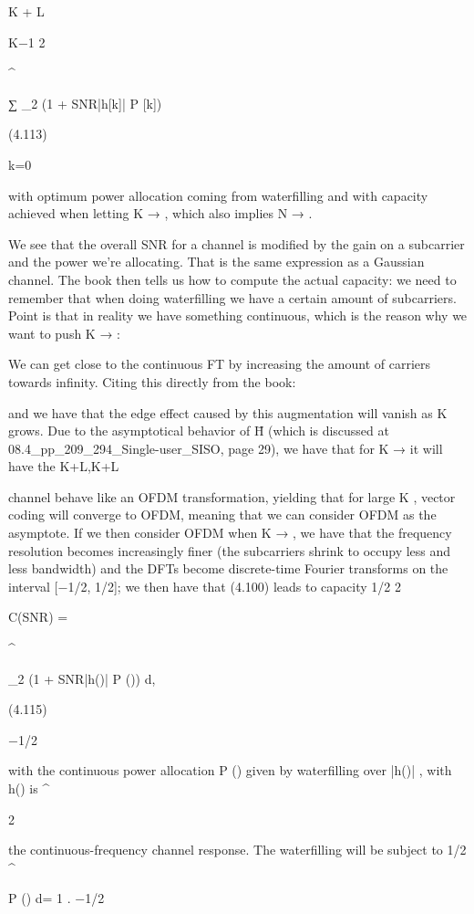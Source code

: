 {{{{{K + L

K−1 2

^\star

∑ \log_2 (1 + SNR|h[k]| P [k])

(4.113)

k=0

with optimum power allocation coming from waterfilling and with capacity achieved when letting K → \infty, which also implies N → \infty.

We see that the overall SNR for a channel is modified by the gain on a subcarrier and the power we're allocating. That is the same expression as a Gaussian channel.
The book then tells us how to compute the actual capacity: we need to remember that when doing waterfilling we have a certain amount of subcarriers. Point is that in reality we have something continuous, which is the reason why we want to push K → \infty:

We can get close to the continuous FT by increasing the amount of carriers towards infinity.
Citing this directly from the book:

and we have that the edge effect caused by this augmentation will vanish as K grows.
Due to the asymptotical behavior of H̄
(which is discussed at 08.4_pp_209_294_Single-user_SISO, page 29), we have that for K → \infty it will have the K+L,K+L

channel behave like an OFDM transformation, yielding that for large K , vector coding will converge to OFDM, meaning that we can consider OFDM as the asymptote.
If we then consider OFDM when K → \infty, we have that the frequency resolution becomes increasingly finer (the subcarriers shrink to occupy less and less bandwidth) and the DFTs become discrete-time Fourier transforms on the interval [−1/2, 1/2]; we then have that (4.100) leads to capacity 1/2 2

C(SNR) = \int

^\star

\log_2 (1 + SNR|h(\nu)| P (\nu)) d\nu ,

(4.115)

−1/2

with the continuous power allocation P (\nu) given by waterfilling over |h(\nu)| , with h(\nu) is
^\star

2

the continuous-frequency channel response.
The waterfilling will be subject to 1/2
^\star

\int

P (\nu) d\nu = 1 .
−1/2

}}}}}
